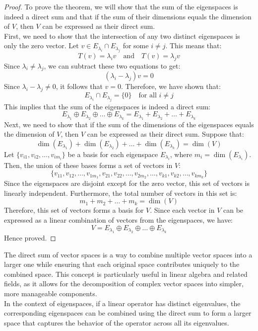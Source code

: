 \documentclass[openany]{book}
\begin{document}
\begin{proof}
    To prove the theorem, we will show that the sum of the eigenspaces is indeed a direct sum and that if the sum of their dimensions equals the dimension of $V$, then $V$ can be expressed as their direct sum. \\
    First, we need to show that the intersection of any two distinct eigenspaces is only the zero vector. Let $v \in E_{\lambda_i} \cap E_{\lambda_j}$ for some $i \neq j$. This means that:
    $$T(v) = \lambda_i v \quad \text{and} \quad T(v) = \lambda_j v$$
    Since $\lambda_i \neq \lambda_j$, we can subtract these two equations to get:
    $$(\lambda_i - \lambda_j)v = 0$$
    Since $\lambda_i - \lambda_j \neq 0$, it follows that $v = 0$. Therefore, we have shown that:
    $$E_{\lambda_i} \cap E_{\lambda_j} = \{0\} \quad \text{for all } i \neq j$$
    This implies that the sum of the eigenspaces is indeed a direct sum:
    $$E_{\lambda_1} \oplus E_{\lambda_2} \oplus \ldots \oplus E_{\lambda_k} = E_{\lambda_1} + E_{\lambda_2} + \ldots + E_{\lambda_k}$$
    Next, we need to show that if the sum of the dimensions of the eigenspaces equals the dimension of $V$, then $V$ can be expressed as their direct sum. Suppose that:
    $$\dim(E_{\lambda_1}) + \dim(E_{\lambda_2}) + \ldots + \dim(E_{\lambda_k}) = \dim(V)$$
    Let $\{v_{i1}, v_{i2}, \ldots, v_{im_i}\}$ be a basis for each eigenspace $E_{\lambda_i}$, where $m_i = \dim(E_{\lambda_i})$. Then, the union of these bases forms a set of vectors in $V$:
    $$\{v_{11}, v_{12}, \ldots, v_{1m_1}, v_{21}, v_{22}, \ldots, v_{2m_2}, \ldots, v_{k1}, v_{k2}, \ldots, v_{km_k}\}$$
    Since the eigenspaces are disjoint except for the zero vector, this set of vectors is linearly independent. Furthermore, the total number of vectors in this set is:
    $$m_1 + m_2 + \ldots + m_k = \dim(V)$$
    Therefore, this set of vectors forms a basis for $V$. Since each vector in $V$ can be expressed as a linear combination of vectors from the eigenspaces, we have:
    $$V = E_{\lambda_1} \oplus E_{\lambda_2} \oplus \ldots \oplus E_{\lambda_k}$$
    Hence proved.
\end{proof}
\begin{mynote}
    The direct sum of vector spaces is a way to combine multiple vector spaces into a larger one while ensuring that each original space contributes uniquely to the combined space. This concept is particularly useful in linear algebra and related fields, as it allows for the decomposition of complex vector spaces into simpler, more manageable components. \\
    In the context of eigenspaces, if a linear operator has distinct eigenvalues, the corresponding eigenspaces can be combined using the direct sum to form a larger space that captures the behavior of the operator across all its eigenvalues.
\end{mynote}
\end{document}

